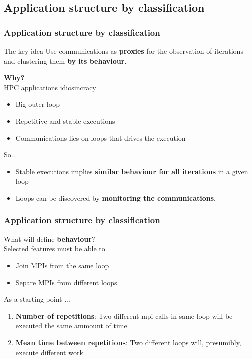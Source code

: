 \documentclass{beamer}
\begin{document}
\subsection{Application structure by classification}
\begin{frame}
\frametitle{Application structure by classification}
\begin{block}{The key idea}
	Use communications as \textbf{proxies} for the observation of iterations and clustering them \textbf{by its behaviour}.
\end{block}
\pause
\textbf{Why?}\\
HPC applications idiosincracy\\
\begin{itemize}
	\item Big outer loop
	\item Repetitive and stable executions
	\item Communications lies on loops that drives the execution
\end{itemize}
So...\\
\begin{itemize}
	\item Stable executions implies \textbf{similar behaviour for all iterations} in a given loop
	\item Loops can be discovered by \textbf{monitoring the communications}.
\end{itemize}
\vfill
\end{frame}

\begin{frame}
\frametitle{Application structure by classification}

What will define \textbf{behaviour}?\\
Selected features must be able to
\begin{itemize}
	\item Join MPIs from the same loop
	\item Separe MPIs from different loops
\end{itemize}
\vfill
\pause
As a starting point ...
\begin{enumerate}
	\item \textbf{Number of repetitions}: Two different mpi calls in same loop will be executed the same ammount of time
	\item \textbf{Mean time between repetitions}: Two different loops will, presumibly, execute different work
\end{enumerate}
\end{frame}
\end{document}
